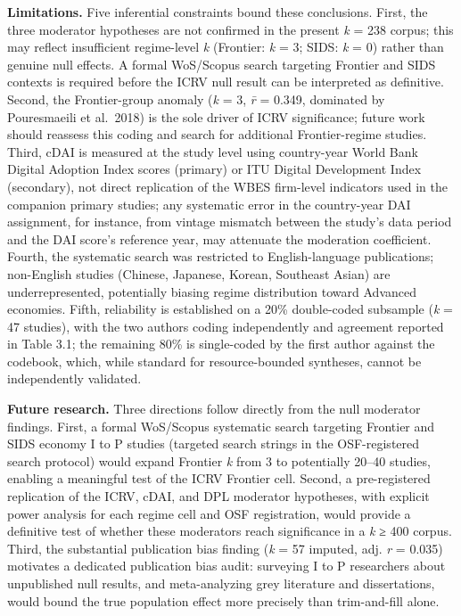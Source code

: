 \documentclass[
  12pt,a4paper]{article}
\begin{document}
\textbf{Limitations.} Five inferential constraints bound these
conclusions. First, the three moderator hypotheses are not confirmed in
the present \emph{k} = 238 corpus; this may reflect insufficient
regime-level \emph{k} (Frontier: \emph{k} = 3; SIDS: \emph{k} = 0)
rather than genuine null effects. A formal WoS/Scopus search targeting
Frontier and SIDS contexts is required before the ICRV null result can
be interpreted as definitive. Second, the Frontier-group anomaly
(\emph{k} = 3, \emph{r̄} = 0.349, dominated by Pouresmaeili et al.~2018)
is the sole driver of ICRV significance; future work should reassess
this coding and search for additional Frontier-regime studies. Third,
cDAI is measured at the study level using country-year World Bank
Digital Adoption Index scores (primary) or ITU Digital Development Index
(secondary), not direct replication of the WBES firm-level indicators
used in the companion primary studies; any systematic error in the
country-year DAI assignment, for instance, from vintage mismatch between
the study's data period and the DAI score's reference year, may
attenuate the moderation coefficient. Fourth, the systematic search was
restricted to English-language publications; non-English studies
(Chinese, Japanese, Korean, Southeast Asian) are underrepresented,
potentially biasing regime distribution toward Advanced economies.
Fifth, reliability is established on a 20\% double-coded subsample
(\emph{k} = 47 studies), with the two authors coding independently and
agreement reported in Table 3.1; the remaining 80\% is single-coded by
the first author against the codebook, which, while standard for
resource-bounded syntheses, cannot be independently validated.

\textbf{Future research.} Three directions follow directly from the null
moderator findings. First, a formal WoS/Scopus systematic search
targeting Frontier and SIDS economy I to P studies (targeted search
strings in the OSF-registered search protocol) would expand Frontier \emph{k} from 3 to
potentially 20--40 studies, enabling a meaningful test of the ICRV
Frontier cell. Second, a pre-registered replication of the ICRV, cDAI,
and DPL moderator hypotheses, with explicit power analysis for each
regime cell and OSF registration, would provide a definitive test of
whether these moderators reach significance in a \emph{k} ≥ 400 corpus.
Third, the substantial publication bias finding (\emph{k} = 57 imputed,
adj. \emph{r} = 0.035) motivates a dedicated publication bias audit:
surveying I to P researchers about unpublished null results, and
meta-analyzing grey literature and dissertations, would bound the true
population effect more precisely than trim-and-fill alone.
\end{document}
